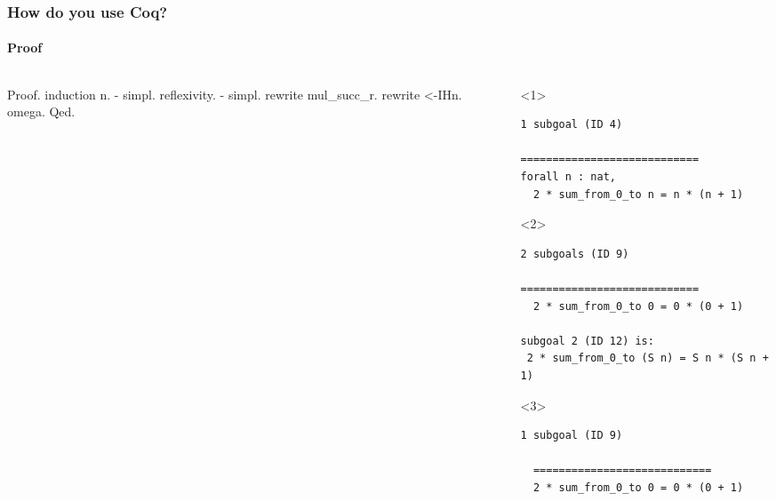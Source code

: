 \documentclass{beamer}
\begin{document}
\begin{frame}[fragile]
  \frametitle{How do you use Coq?}
  \framesubtitle{Proof}


  \begin{columns}

    \begin{column}{0.35\textwidth}

    \minipage[c][0.65\textheight][s]{\columnwidth}
    \footnotesize
    \begin{semiverbatim}
Proof.
  induction n.
  - simpl.
    reflexivity.
  - simpl.
    rewrite mul_succ_r.
    rewrite <-IHn.
    omega.
Qed.
    \end{semiverbatim}
    \endminipage
    \end{column}

    \begin{column}{0.7\textwidth}
    \footnotesize
    \begin{onlyenv}<1>
    \minipage[c][0.65\textheight][s]{\columnwidth}
    \begin{verbatim}
1 subgoal (ID 4)
  
============================
forall n : nat,
  2 * sum_from_0_to n = n * (n + 1)
    \end{verbatim}
    \endminipage
    \end{onlyenv}

    \begin{onlyenv}<2>
    \minipage[c][0.65\textheight][s]{\columnwidth}
    \begin{verbatim}
2 subgoals (ID 9)
  
============================
  2 * sum_from_0_to 0 = 0 * (0 + 1)

subgoal 2 (ID 12) is:
 2 * sum_from_0_to (S n) = S n * (S n + 1)
    \end{verbatim}
    \endminipage
    \end{onlyenv}

    \begin{onlyenv}<3>
    \minipage[c][0.65\textheight][s]{\columnwidth}
    \begin{verbatim}
1 subgoal (ID 9)
  
  ============================
  2 * sum_from_0_to 0 = 0 * (0 + 1)
    \end{verbatim}
    \endminipage
    \end{onlyenv}


\end{column}
\end{columns}
\end{frame}
\end{document}
